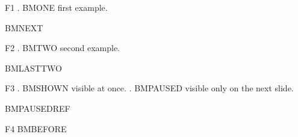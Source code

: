 
\exrefcheck

\begin{frame}{F1}
\ex. BMONE first example.

BMNEXT \Next
\end{frame}
\begin{frame}{F2}
\ex. BMTWO second example.

BMLASTTWO \Last
\end{frame}
\begin{frame}{F3}
\ex. BMSHOWN visible at once.
\pause
\ex. BMPAUSED visible only on the next slide.

BMPAUSEDREF \Last
\end{frame}
\begin{frame}{F4}
BMBEFORE \Next
{}
\end{frame}

